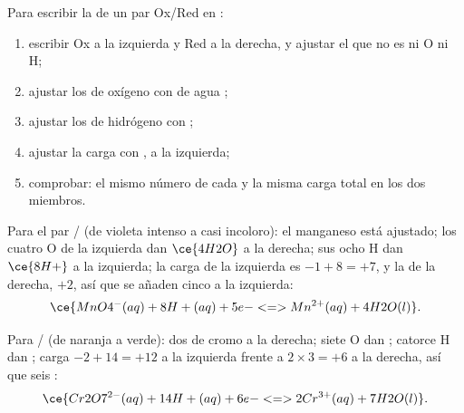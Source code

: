 \begin{method}\label{met:g11:redox:balance}
Para escribir la  de un par Ox/Red en :
\begin{enumerate}
  \item escribir Ox a la izquierda y Red a la derecha, y ajustar el
         que no es ni O ni H;
  \item ajustar los  de oxígeno con  de agua ;
  \item ajustar los  de hidrógeno con  ;
  \item ajustar la carga con  , a la izquierda;
  \item comprobar: el mismo número de cada  y la misma carga total
        en los dos miembros.
\end{enumerate}
\end{method}

\begin{example}\label{ex:g11:redox:permanganate}
Para el par / (de violeta intenso a casi
incoloro): el manganeso está ajustado; los cuatro O de la izquierda dan
$\ce{4H2O}$ a la derecha; sus ocho H dan $\ce{8H+}$ a la izquierda; la
carga de la izquierda es $-1 + 8 = +7$, y la de la derecha, $+2$, así
que se añaden cinco  a la izquierda:
\[
  \ce{MnO4^-(aq) + 8H+(aq) + 5e- <=> Mn^{2+}(aq) + 4H2O(l)}.
\]
\end{example}

\begin{example}\label{ex:g11:redox:dichromate}
Para / (de naranja a verde): dos  de
cromo a la derecha; siete O dan ; catorce H dan ;
carga $-2 + 14 = +12$ a la izquierda frente a $2 \times 3 = +6$ a la
derecha, así que seis :
\[
  \ce{Cr2O7^{2-}(aq) + 14H+(aq) + 6e- <=> 2Cr^{3+}(aq) + 7H2O(l)}.
\]
\end{example}

